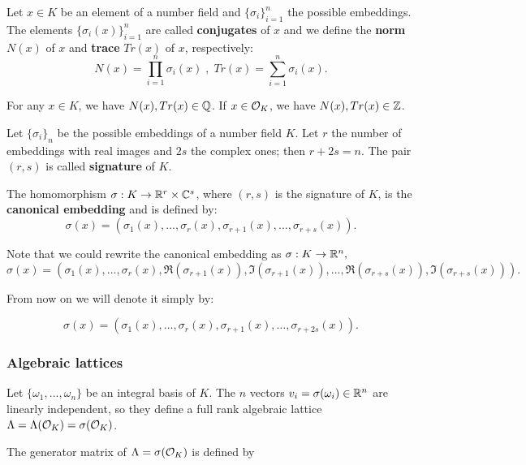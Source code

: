 \documentclass[a4paper,12pt]{article}
\begin{document}
    \begin{definition}
\label{definition:trace-and-norm}
Let $x \in K$ be an element of a number field and $\{\sigma_i\}_{i=1}^n$ the possible
embeddings. The elements $\{\sigma_i(x)\}_{i=1}^n$ are called \textbf{conjugates} of
$x$ and we define the \textbf{norm} $N(x)$ of $x$  and \textbf{trace} $Tr(x)$ of $x$,
respectively:
$$
N(x) = \prod_{i=1}^n{\sigma_i(x)} \;,\;   Tr(x) = \sum_{i=1}^n{\sigma_i(x)}.
$$

\end{definition}
\begin{theorem}
  For any $x \in K$, we have $N(x), Tr(x) \in \mathbb{Q}$. If $x \in \mathcal{O}_K$, we have $N(x),
  Tr(x) \in \mathbb{Z}$.
\end{theorem}


   \begin{definition}
Let $\{\sigma_i\}_n$ be the possible embeddings of a number field $K$. Let $r$ the number of embeddings with real images and $2s$ the complex ones; then
$r + 2s = n$. The pair $\left(r,s\right)$ is called \textbf{signature} of $K$.
\end{definition}

   \begin{definition}\label{definition:canonical-embedding}
The homomorphism $\sigma: K \rightarrow \mathbb{R}^r \times \mathbb{C}^s$, where $(r,s)$ is the signature of $K$, is the \textbf{canonical embedding} and is defined by:
$$
\sigma(x) = \left(\sigma_1(x), ... , \sigma_r(x), \sigma_{r+1}(x), ..., \sigma_{r+s}(x) \right).
$$

Note that we could rewrite the canonical embedding as $\sigma : K \rightarrow \mathbb{R}^n,$
$$
\sigma(x) = \left( \sigma_1(x), ... , \sigma_r(x), \Re(\sigma_{r+1}(x)), \Im(\sigma_{r+1}(x)), ...,
  \Re(\sigma_{r+s}(x)), \Im(\sigma_{r+s}(x)) \right).
$$

From now on we will denote it simply by:

$$
\sigma(x) = \left( \sigma_1(x), \dots , \sigma_r(x), \sigma_{r+1}(x), \dots, \sigma_{r+2s}(x) \right).
$$

\end{definition}
\subsubsection{Algebraic lattices}
\label{sec:orgaaeee02}

\begin{theorem}\label{theorem:algebraic-lattice}
Let $\{\omega_1,...,\omega_n\}$ be an integral basis of $K$. The $n$ vectors $v_i = \sigma(\omega_i)
\in \mathbb{R}^n$ are linearly independent, so they define a full rank algebraic lattice
$\Lambda = \Lambda(\mathcal{O}_K) = \sigma(\mathcal{O}_K)$.
\end{theorem} 
The generator matrix of \(\Lambda = \sigma(\mathcal{O}_K)\) is defined by
\end{document}
